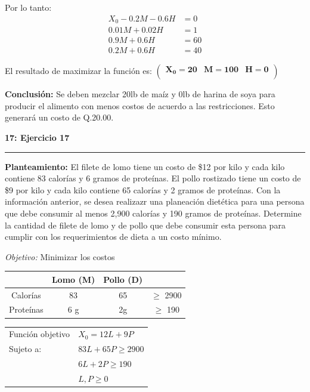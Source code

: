 \documentclass[11pt]{article}
\newcommand\problema[2]{\vspace{.01in}\textbf{#1: #2}\vspace{.5em}\hrule\vspace{.10in}}
\newcommand\planteamiento{\vspace{.10in}\textbf{Planteamiento: }}
\newcommand\conclusion{\vspace{.10in}\textbf{Conclusión: }}
\newcommand\obj{\vspace{.10in}\textit{Objetivo: }}
\begin{document}
Por lo tanto:
\begin{align*}
X_0 - 0.2M - 0.6H &= 0\\
0.01M + 0.02H &= 1\\
0.9M + 0.6H &= 60\\
0.2M + 0.6H &= 40
\end{align*}

El resultado de maximizar la función es:
\begin{math}
\mathbf{\left(\begin{array}{rrr}X_0=20&M=100&H=0\\\end{array}\right)}
\end{math}

\conclusion Se deben mezclar 20lb de maíz y 0lb de harina de soya para producir el alimento con menos costos de acuerdo a las restricciones. Esto generará un costo de Q.20.00.


\pagebreak
\problema{17}{Ejercicio 17}
\planteamiento
El filete de lomo tiene un costo de \$12 por kilo y cada kilo contiene 83 calorías y 6 gramos de proteínas. El pollo rostizado tiene un costo de \$9 por kilo y cada kilo contiene 65 calorías y 2 gramos de proteínas. Con la información anterior, se desea realizazr una planeación dietética para una persona que debe consumir al menos 2,900 calorías y 190 gramos de proteínas. Determine la cantidad de filete de lomo y de pollo que debe consumir esta persona para cumplir con los requerimientos de dieta a un costo mínimo.

\obj Minimizar los costos

\begin{tabular}{|c|c|c|c|}
\hline 
 & Lomo (M) & Pollo (D) &  \\ 
\hline 
Calorías & 83  & 65 & $\geq$ 2900 \\ 
\hline 
Proteínas & 6 g & 2g & $\geq$ 190 \\ 
\hline 
\end{tabular}

\begin{table}[h]
\begin{tabular}{ll}
Función objetivo & $X_0 = 12L+9P$    \\
Sujeto a:        & $83L + 65P \geq 2900$ \\
                 & $6L + 2P \geq 190$ \\
                 & $L,P \geq 0$    
\end{tabular}
\end{table}
\end{document}
